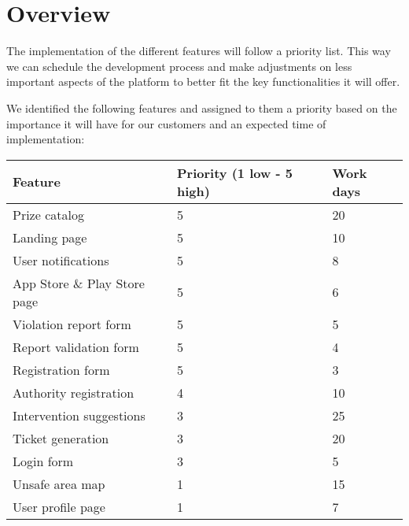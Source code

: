 \section{Overview}

The implementation of the different features will follow a priority list. This way
we can schedule the development process and make adjustments on less important aspects of
the platform to better fit the key functionalities it will offer.

We identified the following features and assigned to them a priority based on the importance
it will have for our customers and an expected time of implementation:

\begin{table}[h]
  \centering
  \begin{tabular}{l|l|l}
    \hline
    \textbf{Feature} & \textbf{Priority (1 low - 5 high)} & \textbf{Work days} \\
    \hline
    Prize catalog & 5 & 20 \\
    Landing page & 5 & 10 \\
    User notifications & 5 & 8 \\
    App Store \& Play Store page & 5 & 6 \\
    Violation report form & 5 & 5 \\
    Report validation form & 5 & 4 \\
    Registration form & 5 & 3 \\
    Authority registration & 4 & 10 \\
    Intervention suggestions & 3 & 25 \\
    Ticket generation & 3 & 20 \\
    Login form & 3 & 5 \\
    Unsafe area map & 1 & 15 \\
    User profile page & 1 & 7 \\
  \end{tabular}
\end{table}